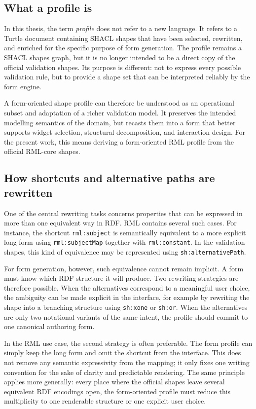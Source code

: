 \subsection{What a profile is}

In this thesis, the term \emph{profile} does not refer to a new language.
It refers to a Turtle document containing SHACL shapes that have been selected, rewritten, and enriched for the specific purpose of form generation.
The profile remains a SHACL shapes graph, but it is no longer intended to be a direct copy of the official validation shapes.
Its purpose is different: not to express every possible validation rule, but to provide a shape set that can be interpreted reliably by the form engine.

A form-oriented shape profile can therefore be understood as an operational subset and adaptation of a richer validation model.
It preserves the intended modelling semantics of the domain, but recasts them into a form that better supports widget selection, structural decomposition, and interaction design.
For the present work, this means deriving a form-oriented RML profile from the official RML-core shapes.

\subsection{How shortcuts and alternative paths are rewritten}

One of the central rewriting tasks concerns properties that can be expressed in more than one equivalent way in RDF.
RML contains several such cases.
For instance, the shortcut \texttt{rml:subject} is semantically equivalent to a more explicit long form using \texttt{rml:subjectMap} together with \texttt{rml:constant}.
In the validation shapes, this kind of equivalence may be represented using \texttt{sh:alternativePath}.

For form generation, however, such equivalence cannot remain implicit.
A form must know which RDF structure it will produce.
Two rewriting strategies are therefore possible.
When the alternatives correspond to a meaningful user choice, the ambiguity can be made explicit in the interface, for example by rewriting the shape into a branching structure using \texttt{sh:xone} or \texttt{sh:or}.
When the alternatives are only two notational variants of the same intent, the profile should commit to one canonical authoring form.

In the RML use case, the second strategy is often preferable.
The form profile can simply keep the long form and omit the shortcut from the interface.
This does not remove any semantic expressivity from the mapping; it only fixes one writing convention for the sake of clarity and predictable rendering.
The same principle applies more generally: every place where the official shapes leave several equivalent RDF encodings open, the form-oriented profile must reduce this multiplicity to one renderable structure or one explicit user choice.

